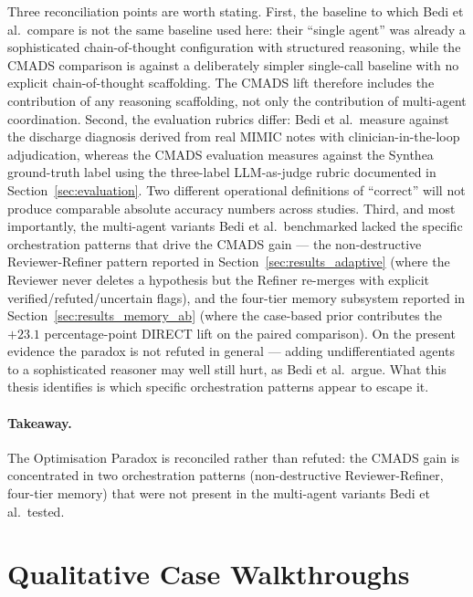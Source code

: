 Three reconciliation points are worth stating. First, the baseline
to which Bedi et al.\ compare is not the same baseline used here:
their ``single agent'' was already a sophisticated chain-of-thought
configuration with structured reasoning, while the CMADS comparison
is against a deliberately simpler single-call baseline with no
explicit chain-of-thought scaffolding. The CMADS lift therefore
includes the contribution of any reasoning scaffolding, not only
the contribution of multi-agent coordination. Second, the
evaluation rubrics differ: Bedi et al.\ measure against the
discharge diagnosis derived from real MIMIC notes with
clinician-in-the-loop adjudication, whereas the CMADS evaluation
measures against the Synthea ground-truth label using the
three-label LLM-as-judge rubric documented in
Section~\ref{sec:evaluation}. Two different operational definitions
of ``correct'' will not produce comparable absolute accuracy
numbers across studies. Third, and most importantly, the
multi-agent variants Bedi et al.\ benchmarked lacked the
specific orchestration patterns that drive the CMADS gain --- the
non-destructive Reviewer-Refiner pattern reported in
Section~\ref{sec:results_adaptive} (where the Reviewer never
deletes a hypothesis but the Refiner re-merges with explicit
verified/refuted/uncertain flags), and the four-tier memory
subsystem reported in Section~\ref{sec:results_memory_ab} (where
the case-based prior contributes the $+23.1$ percentage-point
DIRECT lift on the paired comparison). On the present evidence the
paradox is not refuted in general --- adding undifferentiated
agents to a sophisticated reasoner may well still hurt, as Bedi et
al.\ argue. What this thesis identifies is which specific
orchestration patterns appear to escape it.

\paragraph{Takeaway.} The Optimisation Paradox is reconciled rather
than refuted: the CMADS gain is concentrated in two orchestration
patterns (non-destructive Reviewer-Refiner, four-tier memory) that
were not present in the multi-agent variants Bedi et al.\ tested.

\section{Qualitative Case Walkthroughs}
\label{sec:results_qualitative}

